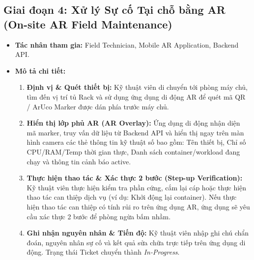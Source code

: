 \subsection{Giai đoạn 4: Xử lý Sự cố Tại chỗ bằng AR (On-site AR Field Maintenance)}
\begin{itemize}
    \item \textbf{Tác nhân tham gia:} Field Technician, Mobile AR Application, Backend API.
    \item \textbf{Mô tả chi tiết:}
    \begin{enumerate}
        \item \textbf{Định vị \& Quét thiết bị:} Kỹ thuật viên di chuyển tới phòng máy chủ, tìm đến vị trí tủ Rack và sử dụng ứng dụng di động AR để quét mã QR / ArUco Marker được dán phía trước máy chủ.
        \item \textbf{Hiển thị lớp phủ AR (AR Overlay):} Ứng dụng di động nhận diện mã marker, truy vấn dữ liệu từ Backend API và hiển thị ngay trên màn hình camera các thẻ thông tin kỹ thuật số bao gồm: Tên thiết bị, Chỉ số CPU/RAM/Temp thời gian thực, Danh sách container/workload đang chạy và thông tin cảnh báo active.
        \item \textbf{Thực hiện thao tác \& Xác thực 2 bước (Step-up Verification):} Kỹ thuật viên thực hiện kiểm tra phần cứng, cắm lại cáp hoặc thực hiện thao tác can thiệp dịch vụ (ví dụ: Khởi động lại container). Nếu thực hiện thao tác can thiệp có tính rủi ro trên ứng dụng AR, ứng dụng sẽ yêu cầu xác thực 2 bước để phòng ngừa bấm nhầm.
        \item \textbf{Ghi nhận nguyên nhân \& Tiến độ:} Kỹ thuật viên nhập ghi chú chẩn đoán, nguyên nhân sự cố và kết quả sửa chữa trực tiếp trên ứng dụng di động. Trạng thái Ticket chuyển thành \textit{In-Progress}.
    \end{enumerate}
\end{itemize}

